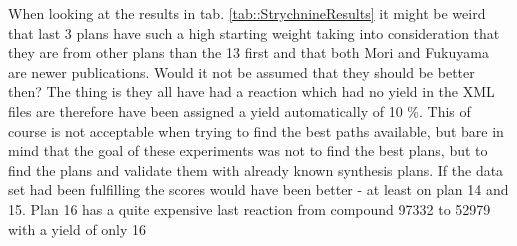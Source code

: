 \documentclass[a4paper,10pt,titlepage]{paper}
\begin{document}
When looking at the results in tab. \ref{tab::StrychnineResults} it might be weird that last 3 plans have such a high starting weight taking into consideration that they are from other plans than the 13 first and that both Mori and Fukuyama are newer publications. Would it not be assumed that they should be better then? The thing is they all have had a reaction which had no yield in the XML files are therefore have been assigned a yield automatically of 10 \%. This of course is not acceptable when trying to find the best paths available, but bare in mind that the goal of these experiments was not to find the best plans, but to find the plans and validate them with already known synthesis plans. If the data set had been fulfilling the scores would have been better - at least on plan 14 and 15. Plan 16 has a quite expensive last reaction from compound 97332 to 52979 with a yield of only 16 %
\end{document}
